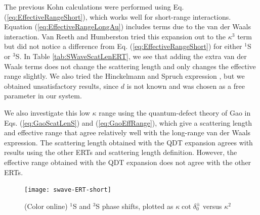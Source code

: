 \documentclass[reprint,showpacs,preprintnumbers,amsmath,amssymb,pra,aps]{revtex4-1}
\begin{document}
The previous Kohn calculations \cite{VanReeth2003} were performed using Eq. (\ref{eq:EffectiveRangeShort}), which works well for short-range interactions. Equation (\ref{eq:EffectiveRangeLongAu}) includes terms due to the van der Waals interaction. Van Reeth and Humberston \cite{VanReeth2003} tried this expansion out to the $\kappa^3$ term but did not notice a difference from Eq. (\ref{eq:EffectiveRangeShort}) for either $^1$S or $^3$S. In Table \ref{tab:SWaveScatLenERT}, we see that adding the extra van der Waals terms does not change the scattering length and only changes the effective range slightly. We also tried the Hinckelmann and Spruch expression \cite{Hinckelmann1971}, but we obtained unsatisfactory results, since $d$ is not known and was chosen as a free parameter in our system.

We also investigate this low $\kappa$ range using the quantum-defect theory of Gao \cite{Gao1998} in Eqs. (\ref{eq:GaoScatLenS}) and (\ref{eq:GaoEffRange}), which give a scattering length and effective range that agree relatively well with the long-range van der Waals expression. The scattering length obtained with the QDT expansion agrees with results using the other ERTs and scattering length definition. However, the effective range obtained with the QDT expansion does not agree with the other ERTs.

\begin{figure}[H]
	\centering
	\texttt{[image: swave-ERT-short]}
	\caption{(Color online) $^1$S and $^3$S phase shifts, plotted as $\kappa \cot \delta_0^\pm$ versus $\kappa^2$}
	\label{fig:swave-ERT-short}
\end{figure}
\end{document}
